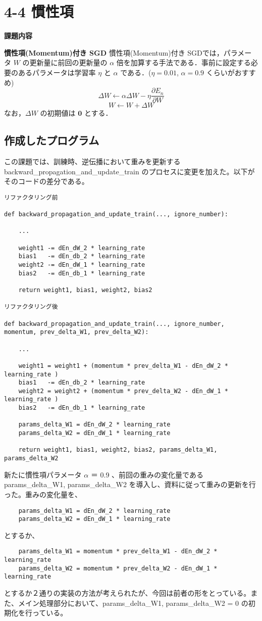 \documentclass[11px,a4,dvipdfmx]{jsarticle}
\begin{document}
\section{4-4 慣性項}
\begin{center}
\textbf{課題内容}
\end{center}
\textbf{慣性項(Momentum)付き SGD} 慣性項(Momentum)付き SGDでは，パラメータ $W$ の更新量に前回の更新量の $\alpha$ 倍を加算する手法である．事前に設定する必要のあるパラメータは学習率 $\eta$ と $\alpha$ である．($\eta=0.01$, $\alpha=0.9$ くらいがおすすめ)
$$
\Delta W \leftarrow \alpha \Delta W - \eta \frac{\partial E_n}{\partial W} \tag{41}
$$
$$
W \leftarrow W + \Delta W \tag{42}
$$
なお，$\Delta W$ の初期値は $\mathbf{0}$ とする．
\subsection{作成したプログラム}
この課題では、訓練時、逆伝播において重みを更新する backward\_propagation\_and\_update\_train のプロセスに変更を加えた。以下がそのコードの差分である。
\begin{verbatim}
リファクタリング前

def backward_propagation_and_update_train(..., ignore_number):

    ...
    
    weight1 -= dEn_dW_2 * learning_rate 
    bias1   -= dEn_db_2 * learning_rate
    weight2 -= dEn_dW_1 * learning_rate 
    bias2   -= dEn_db_1 * learning_rate
    
    return weight1, bias1, weight2, bias2
    
リファクタリング後

def backward_propagation_and_update_train(..., ignore_number, momentum, prev_delta_W1, prev_delta_W2):

    ...
    
    weight1 = weight1 + (momentum * prev_delta_W1 - dEn_dW_2 * learning_rate )
    bias1   -= dEn_db_2 * learning_rate
    weight2 = weight2 + (momentum * prev_delta_W2 - dEn_dW_1 * learning_rate )
    bias2   -= dEn_db_1 * learning_rate
    
    params_delta_W1 = dEn_dW_2 * learning_rate
    params_delta_W2 = dEn_dW_1 * learning_rate
    
    return weight1, bias1, weight2, bias2, params_delta_W1, params_delta_W2
\end{verbatim}
新たに慣性項パラメータ $\alpha$ ＝ 0.9 、前回の重みの変化量である params\_delta\_W1, params\_delta\_W2 を導入し、資料に従って重みの更新を行った。重みの変化量を、
\begin{verbatim}
    params_delta_W1 = dEn_dW_2 * learning_rate
    params_delta_W2 = dEn_dW_1 * learning_rate
\end{verbatim}
とするか、
\begin{verbatim}
    params_delta_W1 = momentum * prev_delta_W1 - dEn_dW_2 * learning_rate
    params_delta_W2 = momentum * prev_delta_W2 - dEn_dW_1 * learning_rate
\end{verbatim}
とするか２通りの実装の方法が考えられたが、今回は前者の形をとっている。また、メイン処理部分において、params\_delta\_W1, params\_delta\_W2 = 0 の初期化を行っている。
\end{document}
